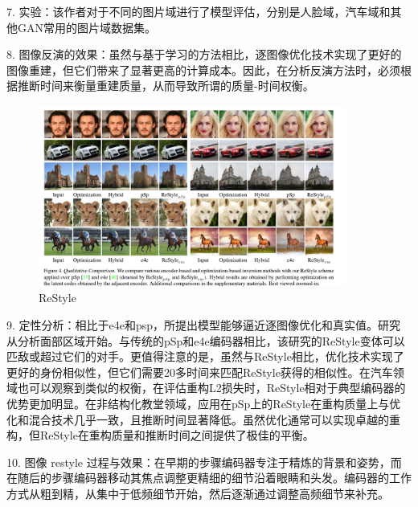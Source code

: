 7. 实验：该作者对于不同的图片域进行了模型评估，分别是人脸域，汽车域和其他GAN常用的图片域数据集。

8. 图像反演的效果：虽然与基于学习的方法相比，逐图像优化技术实现了更好的图像重建，但它们带来了显著更高的计算成本。因此，在分析反演方法时，必须根据推断时间来衡量重建质量，从而导致所谓的质量-时间权衡。

\begin{figure}[htb]
\centering 
\includegraphics[width=0.9\textwidth]{img/m2t27.png} 
\caption{ReStyle}
\label{Test}
\end{figure}

9. 定性分析：相比于e4e和psp，所提出模型能够逼近逐图像优化和真实值。研究从分析面部区域开始。与传统的pSp和e4e编码器相比，该研究的ReStyle变体可以匹敌或超过它们的对手。更值得注意的是，虽然与ReStyle相比，优化技术实现了更好的身份相似性，但它们需要20多时间来匹配ReStyle获得的相似性。在汽车领域也可以观察到类似的权衡，在评估重构L2损失时，ReStyle相对于典型编码器的优势更加明显。在非结构化教堂领域，应用在pSp上的ReStyle在重构质量上与优化和混合技术几乎一致，且推断时间显著降低。虽然优化通常可以实现卓越的重构，但ReStyle在重构质量和推断时间之间提供了极佳的平衡。

10. 图像 restyle 过程与效果：在早期的步骤编码器专注于精炼的背景和姿势，而在随后的步骤编码器移动其焦点调整更精细的细节沿着眼睛和头发。编码器的工作方式从粗到精，从集中于低频细节开始，然后逐渐通过调整高频细节来补充。

